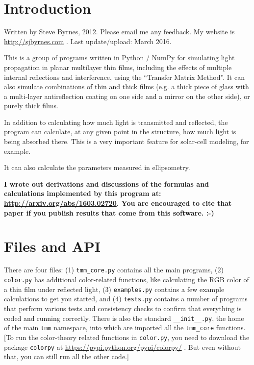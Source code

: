 \documentclass[12pt]{article}
\renewcommand{\(}{\left(}
\renewcommand{\)}{\right)}
\begin{document}
\section{Introduction}

Written by Steve Byrnes, 2012. Please email me any feedback. My website is \url{http://sjbyrnes.com} . Last update/upload: March 2016.

This is a group of programs written in Python / NumPy for simulating light propagation in planar multilayer thin films, including the effects of multiple internal reflections and interference, using the ``Transfer Matrix Method''. It can also simulate combinations of thin and thick films (e.g. a thick piece of glass with a multi-layer antireflection coating on one side and a mirror on the other side), or purely thick films.

In addition to calculating how much light is transmitted and reflected, the program can calculate, at any given point in the structure, how much light is being absorbed there. This is a very important feature for solar-cell modeling, for example.

It can also calculate the parameters measured in ellipsometry.

{\bf I wrote out derivations and discussions of the formulas and calculations implemented by this program at: \url{http://arxiv.org/abs/1603.02720}. You are encouraged to cite that paper if you publish results that come from this software. :-) }

\section{Files and API}

There are four files: (1) \verb=tmm_core.py= contains all the main programs, (2) \verb=color.py= has additional color-related functions, like calculating the RGB color of a thin film under reflected light, (3) \verb=examples.py= contains a few example calculations to get you started, and (4) \verb=tests.py= contains a number of programs that perform various tests and consistency checks to confirm that everything is coded and running correctly. There is also the standard \verb=__init__.py=, the home of the main \verb=tmm= namespace, into which are imported all the \verb=tmm_core= functions. [To run the color-theory related functions in \verb=color.py=, you need to download the package \verb=colorpy= at \url{https://pypi.python.org/pypi/colorpy/} . But even without that, you can still run all the other code.]
\end{document}
